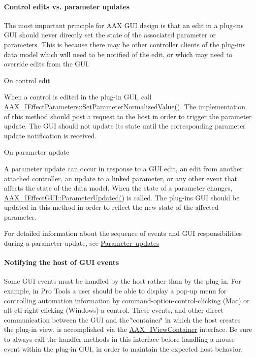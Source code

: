 \hypertarget{a00794_subsubsection__control_edits_vs_parameter_updates_}{}\paragraph{Control edits vs. parameter updates}\label{a00794_subsubsection__control_edits_vs_parameter_updates_}
 The most important principle for A\+AX G\+UI design is that an edit in a plug-\/in\textquotesingle{}s G\+UI should never directly set the state of the associated parameter or parameters. This is because there may be other controller clients of the plug-\/in\textquotesingle{}s data model which will need to be notified of the edit, or which may need to override edits from the G\+UI. 
\begin{DoxyItemize}
\item  On control edit

When a control is edited in the plug-\/in G\+UI, call \mbox{\hyperlink{a01669_a368b0f5a761d1eda4c41b420f153a077}{A\+A\+X\+\_\+\+I\+Effect\+Parameters\+::\+Set\+Parameter\+Normalized\+Value()}}. The implementation of this method should post a request to the host in order to trigger the parameter update. The G\+UI should not update its state until the corresponding parameter update notification is received.  
\item  On parameter update

A parameter update can occur in response to a G\+UI edit, an edit from another attached controller, an update to a linked parameter, or any other event that affects the state of the data model. When the state of a parameter changes, \mbox{\hyperlink{a01665_a45b468fef806611581f748af9301ab4d}{A\+A\+X\+\_\+\+I\+Effect\+G\+U\+I\+::\+Parameter\+Updated()}} is called. The plug-\/in\textquotesingle{}s G\+UI should be updated in this method in order to reflect the new state of the affected parameter.  
\end{DoxyItemize}

For detailed information about the sequence of events and G\+UI responsibilities during a parameter update, see \mbox{\hyperlink{a00820}{Parameter updates}}

\hypertarget{a00794_subsubsection__notifying_the_host_of_gui_events_}{}\paragraph{Notifying the host of G\+U\+I events}\label{a00794_subsubsection__notifying_the_host_of_gui_events_}
 Some G\+UI events must be handled by the host rather than by the plug-\/in. For example, in Pro Tools a user should be able to display a pop-\/up menu for controlling automation information by command-\/option-\/control-\/clicking (Mac) or alt-\/ctl-\/right clicking (Windows) a control. These events, and other direct communication between the G\+UI and the \char`\"{}container\char`\"{} in which the host creates the plug-\/in view, is accomplished via the \mbox{\hyperlink{a01889}{A\+A\+X\+\_\+\+I\+View\+Container}} interface. Be sure to always call the handler methods in this interface before handling a mouse event within the plug-\/in G\+UI, in order to maintain the expected host behavior.



